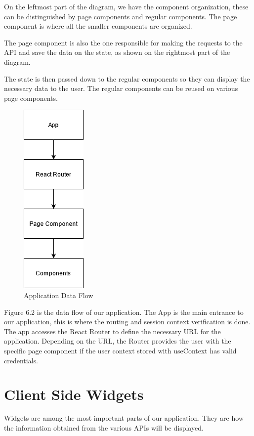 \documentclass[a4paper,twoside,10pt]{report}
\begin{document}
On the leftmost part of the diagram, we have the component organization, these can be distinguished by page components and regular components.
The page component is where all the smaller components are organized. 

The page component is also the one responsible for making the requests to the API and save the data on the state, as shown on the rightmost part of the diagram.

The state is then passed down to the regular components so they can display the necessary data to the user.
The regular components can be reused on various page components.

\newpage
\begin{figure}[h!]
\center
  \includegraphics{client app interations.png}
\caption{Application Data Flow}
\end{figure}
Figure 6.2 is the data flow of our application.
The App is the main entrance to our application, this is where the routing and session context verification is done.
The app accesses the React Router to define the necessary URL for the application. Depending on the URL, the Router provides the user with the specific page component if the user context stored with useContext has valid credentials.

\section{Client Side Widgets}

Widgets are among the most important parts of our application. They are how the information obtained from the various APIs will be displayed.
\end{document}
